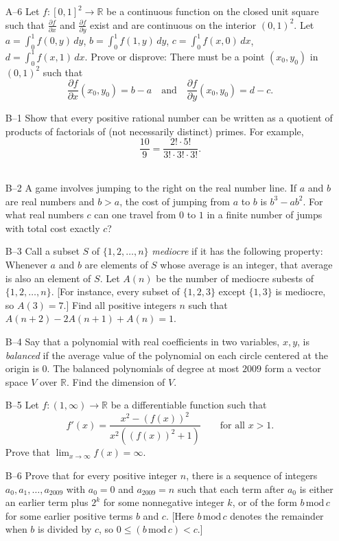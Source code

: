 \documentclass[amssymb,twocolumn,pra,10pt,aps]{revtex4-1}
\begin{document}
\begin{itemize}
\item[A--6]
Let $f:[0,1]^2 \to \mathbb{R}$ be a continuous function on the closed unit
square such that $\frac{\partial f}{\partial x}$ and $\frac{\partial f}{\partial y}$ exist
and are continuous on the interior $(0,1)^2$. Let $a = \int_0^1 f(0,y)\,dy$,
$b = \int_0^1 f(1,y)\,dy$, $c = \int_0^1 f(x,0)\,dx$, $d = \int_0^1 f(x,1)\,dx$.
Prove or disprove: There must be a point $(x_0,y_0)$ in $(0,1)^2$ such that
\[
\frac{\partial f}{\partial x} (x_0,y_0) = b - a
\quad \mbox{and} \quad
\frac{\partial f}{\partial y} (x_0,y_0) = d - c.
\]

\item[B--1]
Show that every positive rational number can be written as a quotient of products of factorials
of (not necessarily distinct) primes. For example,
\[
\frac{10}{9} = \frac{2!\cdot 5!}{3!\cdot 3! \cdot 3!}.
\]
\,

\item[B--2]
A game involves jumping to the right on the real number line. If $a$ and $b$ are real numbers
and $b > a$, the cost of jumping from $a$ to $b$ is $b^3-ab^2$. For what real numbers
$c$ can one travel from $0$ to $1$ in a finite number of jumps with total cost exactly $c$?

\item[B--3]
Call a subset $S$ of $\{1, 2, \dots, n\}$ \emph{mediocre} if it has the following property:
Whenever $a$ and $b$ are elements of $S$ whose average is an integer, that average is also
an element of $S$. Let $A(n)$ be the number of mediocre subests of $\{1,2,\dots,n\}$.
[For instance, every subset of $\{1,2,3\}$ except $\{1,3\}$ is mediocre, so $A(3) =7$.]
Find all positive integers $n$ such that $A(n+2) - 2A(n+1) + A(n) = 1$.

\item[B--4]
Say that a polynomial with real coefficients in two variables, $x,y$, is \emph{balanced} if
the average value of the polynomial on each circle centered at the origin is $0$.
The balanced polynomials of degree at most $2009$ form a vector space $V$ over $\mathbb{R}$.
Find the dimension of $V$.

\item[B--5]
Let $f: (1, \infty) \to \mathbb{R}$ be a differentiable function such that
\[
 f'(x) = \frac{x^2 - (f(x))^2}{x^2((f(x))^2 + 1)}
\qquad \mbox{for all $x>1$.}
\]
Prove that $\lim_{x \to \infty} f(x) = \infty$.

\item[B--6]
Prove that for every positive integer $n$, there is a sequence of integers
$a_0, a_1, \dots, a_{2009}$ with $a_0 = 0$ and $a_{2009} = n$ such that each term
after $a_0$ is either an earlier term plus $2^k$ for some nonnegative integer $k$,
or of the form $b\,\mathrm{mod}\,c$ for some earlier positive terms $b$ and $c$.
[Here $b\,\mathrm{mod}\,c$ denotes the remainder when $b$ is divided by $c$,
so $0 \leq (b\,\mathrm{mod}\,c) < c$.]

\end{itemize}
\end{document}
